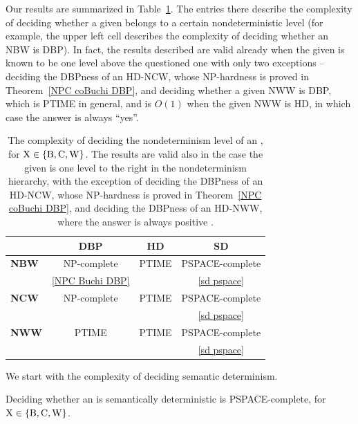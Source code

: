 \documentclass{lmcs}
\begin{document}
 
Our results are summarized in Table~\ref{level}. The entries there describe the complexity of deciding whether a given \nxw belongs to a certain nondeterministic level (for example, the upper left cell describes the complexity of deciding whether an NBW is DBP). In fact, the results described are valid already when the given \nxw is known to be one level above the questioned one with only two exceptions -- deciding the DBPness of an HD-NCW, whose NP-hardness is proved in Theorem~\ref{NPC coBuchi DBP}, and deciding whether a given NWW is DBP, which is PTIME in general, and is $O(1)$ when the given NWW is HD, in which case the answer is always ``yes''. 
\begin{table}[ht!] %
	\begin{center}
		\label{tab:table1}
		\begin{tabular}{lccc}
							&\textbf{DBP}				& \textbf{HD} 		& \textbf{SD}			\\
			\midrule 
			\textbf{NBW} 	& NP-complete 				& PTIME 			& PSPACE-complete	 	\\
							& \autoref{NPC Buchi DBP}	& \cite{BK18} 		& \autoref{sd pspace}	\\
			\midrule
			\textbf{NCW} 	& NP-complete 				& PTIME 			& PSPACE-complete 		\\
							& \cite{KM18}				& \cite{KS15}	 	& \autoref{sd pspace}	\\
			\midrule
			\textbf{NWW}	& PTIME 					& PTIME 			& PSPACE-complete 		\\
							& \cite{KS15,BK18}			& \cite{KS15,BK18} 	& \autoref{sd pspace}	\\
		\end{tabular}
	\end{center}
	\caption{The complexity of deciding the nondeterminism level of an \nxw, for ${\rm X} \in \{{\rm B,C,W}\}$. 
		The results are valid also in the case the given \nxw is one level to the right in the nondeterminism hierarchy, with the exception of deciding the DBPness of an HD-NCW, whose NP-hardness is proved in Theorem~\ref{NPC coBuchi DBP}, and deciding the DBPness of an HD-NWW, where the answer is always positive \cite{BKS17}.}
	\label{level}
\end{table}

We start with the complexity of deciding semantic determinism. 

\begin{thm}
\label{sd pspace}
Deciding whether an \nxw is semantically deterministic is PSPACE-complete, for ${\rm X} \in \{{\rm B,C,W}\}$.
\end{thm}
\end{document}
